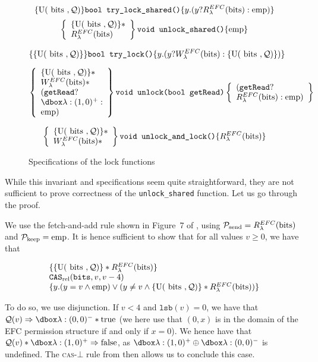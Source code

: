 \begin{figure}
		$$\{\text{U}(\text { bits }, \mathcal{Q})\} \texttt{bool try\_lock\_shared()}\{y. (y ? R_{\lambda}^{EFC}(\text{bits}) : \mathrm{emp})\}$$
\[
\left\{\begin{array}{l}\{\text{U}(\text { bits }, \mathcal{Q})\}* \\ {R_{\lambda}^{EFC}(\text{bits})}\end{array}\right\}
\texttt{void unlock\_shared()} \{\mathrm{emp}\} \]


$$\{\{\text{U}(\text { bits }, \mathcal{Q})\}\}\texttt{bool try\_lock()} \{y. (y ? W_{\lambda}^{EFC}(\text{bits}) : \{\text{U}(\text { bits }, \mathcal{Q})\})\}$$


\[
\left\{\begin{array}{l}\Uperm* \\ \wPerm* \\ (\texttt{getRead} ? \\ \ghost{\lambda: (1, 0)^+} : \\ \emp) \end{array}\right\}
\texttt{void unlock(bool getRead)}
\left\{\begin{array}{l}(\texttt{getRead} ? \\ \rPerm : \emp) \end{array}\right\} \]

\[
\left\{\begin{array}{l}\{\text{U}(\text { bits }, \mathcal{Q})\}* \\ W_{\lambda}^{EFC}(\text{bits})* \end{array}\right\}
\texttt{void unlock\_and\_lock()}
\{R_{\lambda}^{EFC}(\text{bits})\} \]
\caption{Specifications of the lock functions}
\label{fig:specRWFolly}
\end{figure}

While this invariant and specifications seem quite straightforward, they are not sufficient to prove correctness of the \texttt{unlock\_shared} function. Let us go through the proof.

We use the fetch-and-add rule shown in Figure~7 of \cite{fsl}, using $\mathcal{P}_{\text{send}} = R_{\lambda}^{EFC}(\text{bits})$ and $\mathcal{P}_{\text{keep}} = \mathrm{emp}$. It is hence sufficient to show that for all values  $v \geq 0$, we have that 

\[
\begin{array}{l}
\{\{\text{U}(\text { bits }, \mathcal{Q})\} * R_{\lambda}^{EFC}(\text{bits})\} \\
\texttt{CAS}_{\text{rel}}(\texttt{bits}, v, v - 4) \\
\{y. (y = v \land \mathrm{emp}) \lor (y \neq v \land \{\text{U}(\text { bits }, \mathcal{Q})\} * R_{\lambda}^{EFC}(\text{bits}))\}
\end{array}\]

To do so, we use disjunction.
If $v < 4$ and $\texttt{lsb}(v) = 0$, we have that $\mathcal{Q}(v) \Rightarrow \efcm{0}{0} * \text{true}$ (we here use that $(0, x)$ is in the domain of the EFC permission structure if and only if $x = 0$). We hence have that $\mathcal{Q}(v) * \efcp{1}{0} \Rightarrow \text{false}$, as $\efcp{1}{0} \oplus \efcm{0}{0}$ is undefined. The \textsc{cas}-$\bot$ rule from \cite{fsl} then allows us to conclude this case.

